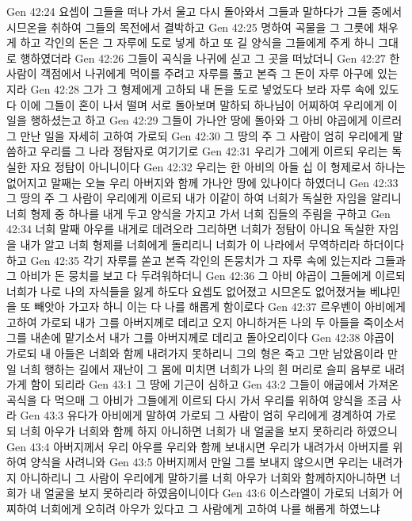 Gen 42:24  요셉이 그들을 떠나 가서 울고 다시 돌아와서 그들과 말하다가 그들 중에서 시므온을 취하여 그들의 목전에서 결박하고
Gen 42:25  명하여 곡물을 그 그릇에 채우게 하고 각인의 돈은 그 자루에 도로 넣게 하고 또 길 양식을 그들에게 주게 하니 그대로 행하였더라
Gen 42:26  그들이 곡식을 나귀에 싣고 그 곳을 떠났더니
Gen 42:27  한 사람이 객점에서 나귀에게 먹이를 주려고 자루를 풀고 본즉 그 돈이 자루 아구에 있는지라
Gen 42:28  그가 그 형제에게 고하되 내 돈을 도로 넣었도다 보라 자루 속에 있도다 이에 그들이 혼이 나서 떨며 서로 돌아보며 말하되 하나님이 어찌하여 우리에게 이 일을 행하셨는고 하고
Gen 42:29  그들이 가나안 땅에 돌아와 그 아비 야곱에게 이르러 그 만난 일을 자세히 고하여 가로되
Gen 42:30  그 땅의 주 그 사람이 엄히 우리에게 말씀하고 우리를 그 나라 정탐자로 여기기로
Gen 42:31  우리가 그에게 이르되 우리는 독실한 자요 정탐이 아니니이다
Gen 42:32  우리는 한 아비의 아들 십 이 형제로서 하나는 없어지고 말째는 오늘 우리 아버지와 함께 가나안 땅에 있나이다 하였더니
Gen 42:33  그 땅의 주 그 사람이 우리에게 이르되 내가 이같이 하여 너희가 독실한 자임을 알리니 너희 형제 중 하나를 내게 두고 양식을 가지고 가서 너희 집들의 주림을 구하고
Gen 42:34  너희 말째 아우를 내게로 데려오라 그리하면 너희가 정탐이 아니요 독실한 자임을 내가 알고 너희 형제를 너희에게 돌리리니 너희가 이 나라에서 무역하리라 하더이다 하고
Gen 42:35  각기 자루를 쏟고 본즉 각인의 돈뭉치가 그 자루 속에 있는지라 그들과 그 아비가 돈 뭉치를 보고 다 두려워하더니
Gen 42:36  그 아비 야곱이 그들에게 이르되 너희가 나로 나의 자식들을 잃게 하도다 요셉도 없어졌고 시므온도 없어졌거늘 베냐민을 또 빼앗아 가고자 하니 이는 다 나를 해롭게 함이로다
Gen 42:37  르우벤이 아비에게 고하여 가로되 내가 그를 아버지께로 데리고 오지 아니하거든 나의 두 아들을 죽이소서 그를 내손에 맡기소서 내가 그를 아버지께로 데리고 돌아오리이다
Gen 42:38  야곱이 가로되 내 아들은 너희와 함께 내려가지 못하리니 그의 형은 죽고 그만 남았음이라 만일 너희 행하는 길에서 재난이 그 몸에 미치면 너희가 나의 흰 머리로 슬피 음부로 내려가게 함이 되리라
Gen 43:1  그 땅에 기근이 심하고
Gen 43:2  그들이 애굽에서 가져온 곡식을 다 먹으매 그 아비가 그들에게 이르되 다시 가서 우리를 위하여 양식을 조금 사라
Gen 43:3  유다가 아비에게 말하여 가로되 그 사람이 엄히 우리에게 경계하여 가로되 너희 아우가 너희와 함께 하지 아니하면 너희가 내 얼굴을 보지 못하리라 하였으니
Gen 43:4  아버지께서 우리 아우를 우리와 함께 보내시면 우리가 내려가서 아버지를 위하여 양식을 사려니와
Gen 43:5  아버지께서 만일 그를 보내지 않으시면 우리는 내려가지 아니하리니 그 사람이 우리에게 말하기를 너희 아우가 너희와 함께하지아니하면 너희가 내 얼굴을 보지 못하리라 하였음이니이다
Gen 43:6  이스라엘이 가로되 너희가 어찌하여 너희에게 오히려 아우가 있다고 그 사람에게 고하여 나를 해롭게 하였느냐
